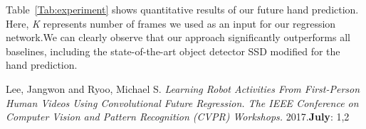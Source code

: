 \documentclass{article}
\begin{document}
Table~\ref{Tab:experiment} shows quantitative results of our future hand prediction. Here, \emph{K} represents number of frames we used as an input for our regression network.We can clearly observe that our approach significantly outperforms all baselines, including the state-of-the-art object detector SSD modified for the hand prediction.\par
 
%
\begin{thebibliography}{99}
 Lee, Jangwon and Ryoo, Michael S. \emph{Learning Robot Activities From First-Person Human Videos Using Convolutional Future Regression. The IEEE Conference on Computer Vision and Pattern Recognition (CVPR) Workshops.} 2017.{\bf July}: 1,2
\end{thebibliography}
\end{document}

